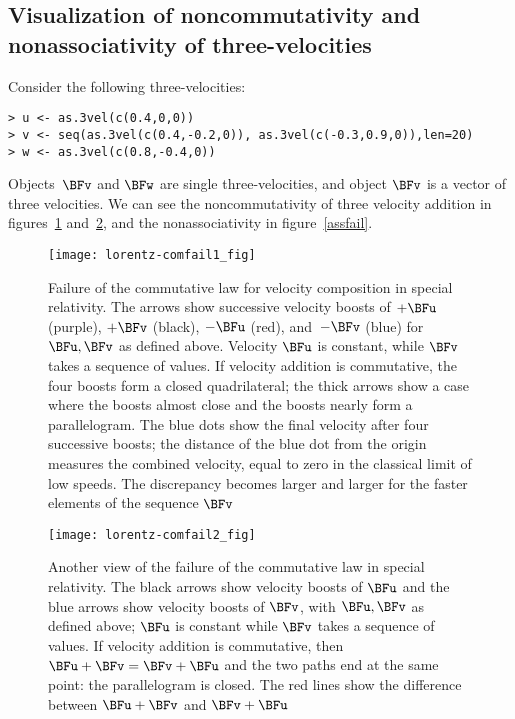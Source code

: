 \documentclass[ijoc,nonblindrev]{informs3} %
\begin{document}
\subsection{Visualization of noncommutativity and nonassociativity of three-velocities}

Consider the following three-velocities:

\begin{verbatim}
> u <- as.3vel(c(0.4,0,0))
> v <- seq(as.3vel(c(0.4,-0.2,0)), as.3vel(c(-0.3,0.9,0)),len=20)
> w <- as.3vel(c(0.8,-0.4,0))

\end{verbatim}

Objects~$\BFv$ and $\BFw$ are single three-velocities, and object $\BFv$
 is a vector of three velocities.  We can see the noncommutativity of
 three velocity addition in figures~\ref{comfail1} and~\ref{comfail2},
 and the nonassociativity in figure~\ref{assfail}.

\begin{figure}[htbp]
  \begin{center}
\texttt{[image: lorentz-comfail1\_fig]}
\caption{Failure\label{comfail1} of the commutative law for velocity
  composition in special relativity.  The arrows show successive
  velocity boosts of $+\BFu$ (purple), $+\BFv$ (black), $-\BFu$ (red),
  and~$-\BFv$ (blue) for $\BFu,\BFv$ as defined above.  Velocity $\BFu$ is
  constant, while $\BFv$ takes a sequence of values.  If velocity
  addition is commutative, the four boosts form a closed
  quadrilateral; the thick arrows show a case where the boosts almost
  close and the boosts nearly form a parallelogram.  The blue dots
  show the final velocity after four successive boosts; the distance
  of the blue dot from the origin measures the combined velocity,
  equal to zero in the classical limit of low speeds.  The discrepancy
  becomes larger and larger for the faster elements of the sequence
  $\BFv$}
  \end{center}
\end{figure}

\begin{figure}[htbp]
  \begin{center}
\texttt{[image: lorentz-comfail2\_fig]}
\caption{Another view of the failure of the commutative
  law\label{comfail2} in special relativity.  The black arrows show
  velocity boosts of $\BFu$ and the blue arrows show velocity boosts of
  $\BFv$, with $\BFu,\BFv$ as defined above; $\BFu$ is constant while
  $\BFv$ takes a sequence of values.  If velocity addition is
  commutative, then $\BFu+\BFv=\BFv+\BFu$ and the two paths end at the
  same point: the parallelogram is closed.  The red lines show the
  difference between $\BFu+\BFv$ and $\BFv+\BFu$}
  \end{center}
\end{figure}
\end{document}
